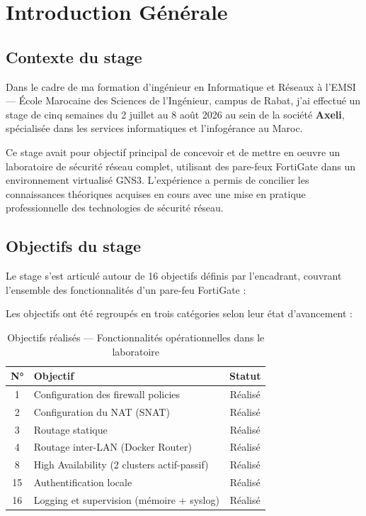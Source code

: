 \chapter{Introduction Générale}
\label{chap:introduction}

\section{Contexte du stage}

Dans le cadre de ma formation d'ingénieur en Informatique et Réseaux à l'EMSI --- École Marocaine des Sciences de l'Ingénieur, campus de Rabat, j'ai effectué un stage de cinq semaines du 2 juillet au 8 août 2026 au sein de la société \textbf{Axeli}, spécialisée dans les services informatiques et l'infogérance au Maroc.

Ce stage avait pour objectif principal de concevoir et de mettre en oeuvre un laboratoire de sécurité réseau complet, utilisant des pare-feux FortiGate dans un environnement virtualisé GNS3. L'expérience a permis de concilier les connaissances théoriques acquises en cours avec une mise en pratique professionnelle des technologies de sécurité réseau.

\section{Objectifs du stage}

Le stage s'est articulé autour de 16 objectifs définis par l'encadrant, couvrant l'ensemble des fonctionnalités d'un pare-feu FortiGate :

Les objectifs ont été regroupés en trois catégories selon leur état d'avancement :

\begin{table}[H]
\centering
\caption{Objectifs réalisés --- Fonctionnalités opérationnelles dans le laboratoire}
\label{tab:objectifs-realises}
\begin{tabularx}{\textwidth}{|c|X|c|}
\hline
\textbf{N°} & \textbf{Objectif} & \textbf{Statut} \\
\hline
1 & Configuration des firewall policies & Réalisé \\
2 & Configuration du NAT (SNAT) & Réalisé \\
3 & Routage statique & Réalisé \\
4 & Routage inter-LAN (Docker Router) & Réalisé \\
8 & High Availability (2 clusters actif-passif) & Réalisé \\
15 & Authentification locale & Réalisé \\
16 & Logging et supervision (mémoire + syslog) & Réalisé \\
\hline
\end{tabularx}
\end{table}

